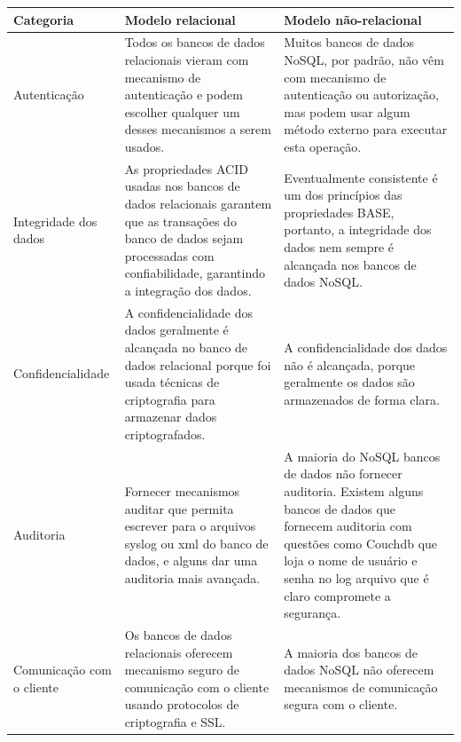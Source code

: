 \begin{tabularx}{0.9\textwidth} { 
  | >{\raggedright\arraybackslash}X 
  | >{\raggedright\arraybackslash}X 
  | >{\raggedright\arraybackslash}X | }
 \hline
 Categoria & Modelo relacional & Modelo não-relacional \\
 \hline
 Autenticação  & Todos os bancos de dados relacionais vieram com mecanismo de autenticação e podem escolher qualquer um desses mecanismos a serem usados.  & Muitos bancos de dados NoSQL, por padrão, não vêm com mecanismo de autenticação ou autorização, mas podem usar algum método externo para executar esta operação.  \\
\hline
Integridade dos dados & As propriedades ACID usadas nos bancos de dados relacionais garantem que as transações do banco de dados sejam processadas com confiabilidade, garantindo a integração dos dados. & Eventualmente consistente é um dos princípios das propriedades BASE, portanto, a integridade dos dados nem sempre é alcançada nos bancos de dados NoSQL. \\
\hline
Confidencialidade & A confidencialidade dos dados geralmente é alcançada no banco de dados relacional porque foi usada técnicas de criptografia para armazenar dados criptografados. & A confidencialidade dos dados não é alcançada, porque geralmente os dados são armazenados de forma clara. \\
\hline
Auditoria & Fornecer mecanismos auditar que permita escrever para o arquivos syslog ou xml do banco de dados, e alguns dar uma auditoria mais avançada. & A maioria do NoSQL bancos de dados não fornecer auditoria. Existem alguns bancos de dados que fornecem auditoria com questões como Couchdb que loja o nome de usuário e senha no log arquivo que é claro compromete a segurança. \\
\hline
Comunicação com o cliente & Os bancos de dados relacionais oferecem mecanismo seguro de comunicação com o cliente usando protocolos de criptografia e SSL. & A maioria dos bancos de dados NoSQL não oferecem mecanismos de comunicação segura com o cliente. \\
\hline
\end{tabularx}



